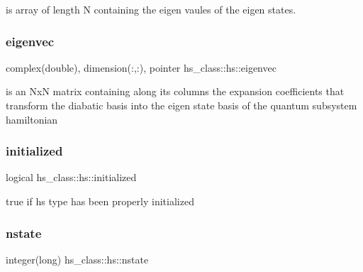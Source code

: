 is array of length N containing the eigen vaules of the eigen states. 

\mbox{\label{strucths__class_1_1hs_aac60f7bc14df6c4a5a1363c70b69b2db}} 
\subsubsection{\texorpdfstring{eigenvec}{eigenvec}}
{\footnotesize\ttfamily complex(double), dimension(\+:,\+:), pointer hs\+\_\+class\+::hs\+::eigenvec\hspace{0.3cm}{\ttfamily [private]}}



is an NxN matrix containing along its columns the expansion coefficients that transform the diabatic basis into the eigen state basis of the quantum subsystem hamiltonian 

\mbox{\label{strucths__class_1_1hs_a39ff1ef8fc5a20f97973d4947d518c5f}} 
\subsubsection{\texorpdfstring{initialized}{initialized}}
{\footnotesize\ttfamily logical hs\+\_\+class\+::hs\+::initialized\hspace{0.3cm}{\ttfamily [private]}}



true if hs type has been properly initialized 

\mbox{\label{strucths__class_1_1hs_acb57246378a120bd330012dae9a3ff38}} 
\subsubsection{\texorpdfstring{nstate}{nstate}}
{\footnotesize\ttfamily integer(long) hs\+\_\+class\+::hs\+::nstate\hspace{0.3cm}{\ttfamily [private]}}



